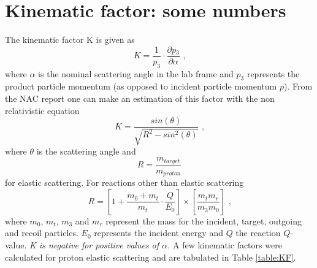 \documentclass[11pt]{report}
\begin{document}



\section{Kinematic factor: some numbers}

The kinematic factor K is given as 
\begin{equation} 
K=\frac{1}{p_3} \cdot \frac{\partial p{_3}}{\partial \alpha} \label{eq:kfactor} \textrm{      ,}
\end{equation} 
where $\alpha$ is the nominal scattering angle in the lab frame and $p_3$ represents the product  
particle momentum (as opposed to incident particle momentum $p$).
From the NAC report \cite{NAC92} %
one can make an estimation of this factor
with the non relativistic equation 
%
\begin{equation} 
K=\frac{sin(\theta)}{\sqrt{R^{2}-sin^2(\theta)}}      \label{eq:kfactor2} \textrm{      ,}
\end{equation} 
where $\theta$ is the scattering angle and
\begin{equation} 
R=\frac{m_{target}}{m_{proton}}
\end{equation} 
for elastic scattering. 
For reactions other than elastic scattering
\begin{equation} 
R=\left[ 1+\frac{m_{0} +m_{t}}{m_{t}}\cdot \frac{Q}{E_{0}}\right] \times [\frac{m_{t}m_{r}}{m_{3}m_{0}} ]   \label{eq:R} \textrm{      ,}
\end{equation} 
where $m_{0}$, $m_{t}$, $m_{3}$ and  $m_{r}$ represent the mass for
the incident, target, outgoing and recoil particles. $E_0$ represents the incident
energy and $Q$ the reaction $Q$-value.
{\it K is negative for positive values of $\alpha$. }
A few kinematic factors were calculated for proton elastic scattering 
and are tabulated in Table \ref{table:KF}.
\end{document}
